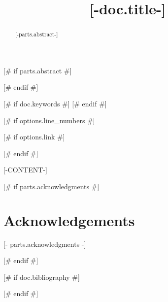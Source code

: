 \documentclass{article}
\title{[-doc.title-]}
\author[
	[--author.affiliations|join(', ', 'index')--]
	[#-if author.email-#]
	\thanks{\texttt{[-author.email-]}}
	[#-endif-#]
]{
	[--author.name-]
	[#- if author.orcid -#]
	\href{https://orcid.org/[-author.orcid-]}{\orcidicon}
	[#- endif -#]
}
[# endfor #]
[# for affiliation in doc.affiliations #]
\affil[[-affiliation.index-]]{[-affiliation.value-]}
[# endfor #]
\begin{document}
\maketitle

[# if parts.abstract #]
\begin{abstract}
[-parts.abstract-]\\
\end{abstract}
[# endif #]

[# if doc.keywords #]
[# endif #]

\vspace{0.35cm}

[# if options.line_numbers #]\linenumbers[# endif #]

[# if options.link #]
\footnotesize
{}

\normalsize
[# endif #]


[-CONTENT-]

[# if parts.acknowledgments #]
\footnotesize
\section*{Acknowledgements}
[- parts.acknowledgments -]

\normalsize
[# endif #]


[# if doc.bibliography #]

[# endif #]
\end{document}
